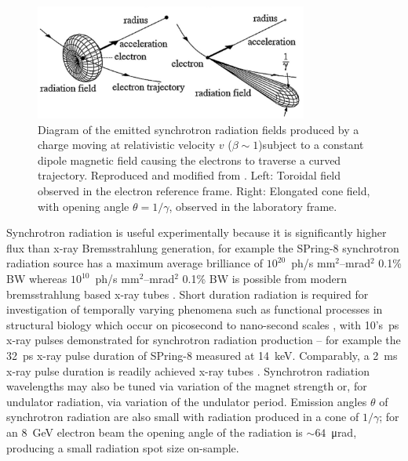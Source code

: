 \documentclass[../main.tex]{subfiles}
\begin{document}
\begin{figure}[!h]
\centering
\includegraphics[width=0.8\textwidth]{Figures/Introduction/Synchrotron_Radiation_Diagram.pdf}
\caption{Diagram of the emitted synchrotron radiation fields produced by a charge moving at relativistic velocity $v$ ($\beta\sim 1$)subject to a constant dipole magnetic field causing the electrons to traverse a curved trajectory. Reproduced and modified from \cite{eberhardt2015synchrotron}. Left: Toroidal field observed in the electron reference frame. Right: Elongated cone field, with opening angle $\theta = 1/\gamma$, observed in the laboratory frame.}
\label{fig:synchrotron_radiation_diagram}
\end{figure}
Synchrotron radiation is useful experimentally because it is significantly higher flux than x-ray Bremsstrahlung generation, for example the SPring-8 synchrotron radiation source has a maximum average brilliance of $10^{20}$~ph/\si{\second} \si{\milli\meter}$^{2}$--\si{\milli\radian}$^{2}$ 0.1\% BW \cite{spring8beamlines} whereas $10^{10}$~ph/\si{\second} \si{\milli\meter}$^{2}$--\si{\milli\radian}$^{2}$ 0.1\% BW is possible from modern bremsstrahlung based x-ray tubes \cite{behling2018diagnostic}. Short duration radiation is required for investigation of temporally varying phenomena such as functional processes in structural biology which occur on picosecond to nano-second scales \cite{burnett2020uk}, with  10's~\si{\pico\second} x-ray pulses demonstrated for synchrotron radiation production -- for example the 32~\si{\pico\second} x-ray pulse duration of SPring-8 measured at 14~\si{\kilo\electronvolt}. Comparably, a 2~\si{\milli\second} x-ray pulse duration is readily achieved x-ray tubes \cite{behling2018diagnostic}. Synchrotron radiation wavelengths may also be tuned via variation of the magnet strength or, for undulator radiation, via variation of the undulator period. Emission angles $\theta$ of synchrotron radiation are also small with radiation produced in a cone of $1/\gamma$; for an 8~\si{\giga\electronvolt} electron beam the opening angle of the radiation is $\sim 64$~\si{\micro\radian}, producing a small radiation spot size on-sample.        
\end{document}
